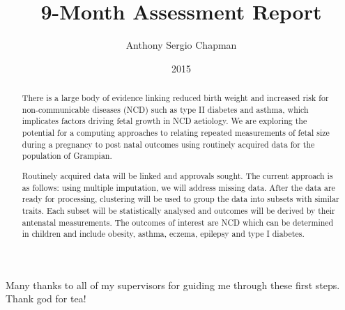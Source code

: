 \documentclass[bsc]{abdnthesis}
\author{Anthony Sergio Chapman}
\title{9-Month Assessment Report}
\date{2015}
\begin{document}
\maketitle
\makedeclaration


\begin{abstract}
There is a large body of evidence linking reduced birth weight and increased risk for non-communicable diseases (NCD) such as type II diabetes and asthma, which implicates factors driving fetal growth in NCD aetiology. We are exploring the potential for a computing approaches to relating repeated measurements of fetal size during a pregnancy to post natal outcomes using routinely acquired data for the population of Grampian.

Routinely acquired data will be linked and approvals sought.  The current approach is as follows: using multiple imputation, we will address missing data. After the data are ready for processing, clustering will be used to group the data into subsets with similar traits. Each subset will be statistically analysed and outcomes will be derived by their antenatal measurements. The outcomes of interest are NCD which can be determined in children and include obesity, asthma, eczema, epilepsy and type I diabetes.
\end{abstract}

\begin{acknowledgements}
	Many thanks to all of my supervisors for guiding me through these first steps. Thank god for tea!
\end{acknowledgements}

\tableofcontents
\listoftables
\listoffigures

\end{document}
